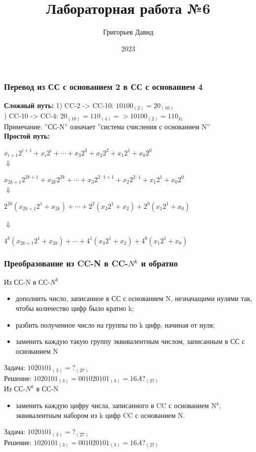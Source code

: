 \documentclass[10pt,pdf,hyperref={unicode},aspectratio=169]{beamer}
\title{Лабораторная работа №6}
\author{Григорьев Давид}
\date{2023}
\begin{document}
\begin{frame}
	
\frametitle{Перевод из СС с основанием 2 в СС с основанием 4}

\textbf{Сложный путь: } 1) CC-2 -> CC-10: $10100_{(2)} = 20_{(10)}$ \\
\qquad\qquad\qquad{}) CC-10 -> CC-4: $20_{(10)} = 110_{(4)} => 10100_{(2)} = 110_{4)}$\\

Примечание: ''СС-N'' означает ''система счисления с основанием N''\\
\vspace{3em}
\textbf{Простой путь:}

\begin{center}
	$x_{i+1}2^{i+1} + x_{i}2^{i} + \cdots + x_{3}2^{3} + x_{2}2^{2} + x_{1}2^{1} + x_{0}2^{0}$\\
	
	$\Downarrow$	
	
	$x_{2k+1}2^{2k+1} + x_{2k}2^{2k} + \cdots + x_{3}2^{2 \cdot 1 + 1} + x_{2}2^{2 \cdot 1} + x_{1}2^{1} + x_{0}2^{0}$\\
	
	$\Downarrow$	
	
	$2^{2k}(x_{2k+1}2^{1} + x_{2k}) + \cdots + 2^{2}(x_{3}2^{1} + x_{2}) + 2^0(x_{1}2^1 + x_{0})$
	
	$\Downarrow$
	
	$4^k(x_{2k+1}2^{1} + x_{2k}) + \cdots + 4^{1}(x_{3}2^{1} + x_{2}) + 4^{0}(x_{1}2^{1} + x_{0})$
	
\end{center}

\end{frame}

\begin{frame}
	
	\frametitle{Преобразование из CC-N в CC-$N^{k}$ и обратно}
	\footnotesize
	\textcolor{coolgreen}{Из СС-N в СС-$N^{k}$}
	\begin{itemize}
		\item дополнить число, записанное в СС с основанием N, незначащими нулями так, чтобы количество цифр было кратно k;
		\item разбить полученное число на группы по k цифр, начиная от нуля;
		\item заменить каждую такую группу эквивалентным числом, записанным в СС с основанием N
	\end{itemize}
	\qquad\qquad\qquad\qquad Задача: $1020101_{(3)} = ?_{(27)}$\\
	\qquad\qquad\qquad\qquad Решение: $1020101_{(3)} = 001 020 101_{(3)} = 16A?_{(27)}$\\
	
	\textcolor{coolgreen}{Из СС-$N^{k}$ в СС-N}
	\begin{itemize}
		\item заменить каждую цифру числа, записанного в CC с основанием N$^{k}$, эквивалентным набором из k цифр CC с основанием N.
	\end{itemize}
	\qquad\qquad\qquad\qquad Задача: $1020101_{(3)} = ?_{(27)}$\\
	\qquad\qquad\qquad\qquad Решение: $1020101_{(3)} = 001 020 101_{(3)} = 16A?_{(27)}$
	
\end{frame}
	
\end{document}
